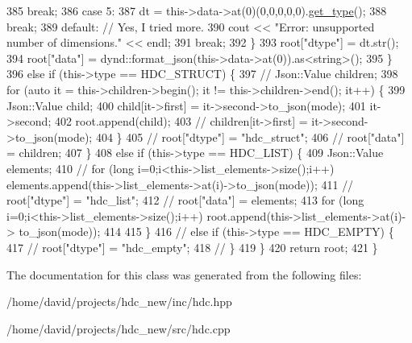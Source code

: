 \begin{DoxyCode}
385                     \textcolor{keywordflow}{break};
386                 \textcolor{keywordflow}{case} 5:
387                     dt = this->data->at(0)(0,0,0,0,0).\hyperlink{a00003_ac12e6d9074533304ea4d3eb08623d774}{get\_type}();
388                     \textcolor{keywordflow}{break};
389                 \textcolor{keywordflow}{default}: \textcolor{comment}{// Yes, I tried more.}
390                     cout << \textcolor{stringliteral}{"Error: unsupported number of dimensions."} << endl;
391                     \textcolor{keywordflow}{break};
392             \}
393             root[\textcolor{stringliteral}{"dtype"}] = dt.str();
394             root[\textcolor{stringliteral}{"data"}] = dynd::format\_json(this->data->at(0)).as<string>();        
395         \}
396         \textcolor{keywordflow}{else} \textcolor{keywordflow}{if} (this->type == HDC\_STRUCT) \{
397 \textcolor{comment}{//             Json::Value children;}
398             \textcolor{keywordflow}{for} (\textcolor{keyword}{auto} it = this->children->begin(); it != this->children->end(); it++) \{
399                 Json::Value child;
400                 child[it->first] = it->second->to\_json(mode);
401                 it->second;
402                 root.append(child);
403 \textcolor{comment}{//                 children[it->first] = it->second->to\_json(mode);}
404             \}
405 \textcolor{comment}{//             root["dtype"] = "hdc\_struct";}
406 \textcolor{comment}{//             root["data"] = children;}
407         \}
408         \textcolor{keywordflow}{else} \textcolor{keywordflow}{if} (this->type == HDC\_LIST) \{
409             Json::Value elements;
410 \textcolor{comment}{//             for (long i=0;i<this->list\_elements->size();i++)
       elements.append(this->list\_elements->at(i)->to\_json(mode));}
411 \textcolor{comment}{//             root["dtype"] = "hdc\_list";}
412 \textcolor{comment}{//             root["data"] = elements;}
413             \textcolor{keywordflow}{for} (\textcolor{keywordtype}{long} i=0;i<this->list\_elements->size();i++) root.append(this->list\_elements->at(i)->
      to\_json(mode));
414 
415         \}
416 \textcolor{comment}{//         else if (this->type == HDC\_EMPTY) \{}
417 \textcolor{comment}{//             root["dtype"] = "hdc\_empty";}
418 \textcolor{comment}{//         \}}
419     \}
420     \textcolor{keywordflow}{return} root;
421 \}
\end{DoxyCode}


The documentation for this class was generated from the following files\+:\begin{DoxyCompactItemize}
\item 
/home/david/projects/hdc\+\_\+new/inc/hdc.\+hpp\item 
/home/david/projects/hdc\+\_\+new/src/hdc.\+cpp\end{DoxyCompactItemize}
